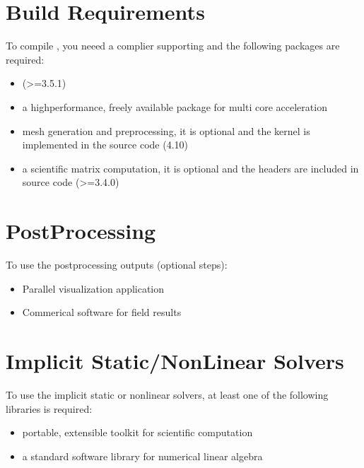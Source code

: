 \documentclass[letterpaper,10pt,english]{sphinxmanual}
\begin{document}
\section{Build Requirements}
\label{\detokenize{rst_about_project/requirements:build-requirements}}
To compile , you neeed a complier supporting  and the following packages are required:
\begin{itemize}
\item {} 
 (\textgreater{}=3.5.1)

\item {} 
 \sphinxhyphen{} a high\sphinxhyphen{}performance, freely available package for multi core acceleration

\item {} 
 \sphinxhyphen{}  mesh generation and pre\sphinxhyphen{}processing, it is optional and the kernel is implemented in the source code (4.10)

\item {} 
 \sphinxhyphen{} a scientific matrix computation, it is optional and the headers are included in source code (\textgreater{}=3.4.0)

\end{itemize}


\section{Post\sphinxhyphen{}Processing}
\label{\detokenize{rst_about_project/requirements:post-processing}}
To use the post\sphinxhyphen{}processing outputs (optional steps):
\begin{itemize}
\item {} 
 \sphinxhyphen{} Parallel visualization application

\item {} 
 \sphinxhyphen{} Commerical software for field results

\end{itemize}


\section{Implicit Static/Non\sphinxhyphen{}Linear Solvers}
\label{\detokenize{rst_about_project/requirements:implicit-static-non-linear-solvers}}
To use the implicit static or nonlinear solvers, at least one of the following libraries is required:
\begin{itemize}
\item {} 
 \sphinxhyphen{} portable, extensible toolkit for scientific computation

\item {} 
 \sphinxhyphen{} a standard software library for numerical linear algebra

\end{itemize}
\end{document}
